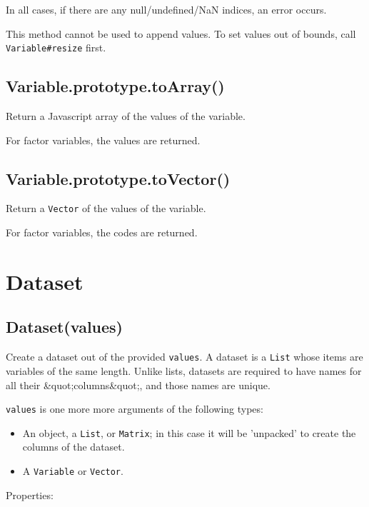 \documentclass{article}
\begin{document}
In all cases, if there are any null/undefined/NaN indices, an error occurs.


This method cannot be used to append values. To set values out of bounds,
call \texttt{Variable\#resize} first.


    \subsection*{Variable.prototype.toArray()}
    Return a Javascript array of the values of the variable.


For factor variables, the values are returned.


    \subsection*{Variable.prototype.toVector()}
    Return a \texttt{Vector} of the values of the variable.


For factor variables, the codes are returned.


  \section{Dataset}
    \subsection*{Dataset(values)}
    Create a dataset out of the provided \texttt{values}. A dataset is a \texttt{List} whose items
are variables of the same length. Unlike lists, datasets are required to have names
for all their \&quot;columns\&quot;, and those names are unique.


\texttt{values} is one more more arguments of the following types:


\begin{itemize}

\item An object, a \texttt{List}, or \texttt{Matrix}; in this case it will be 'unpacked' to create
the columns of the dataset.

\item A \texttt{Variable} or \texttt{Vector}.

\end{itemize}

Properties:
\end{document}
